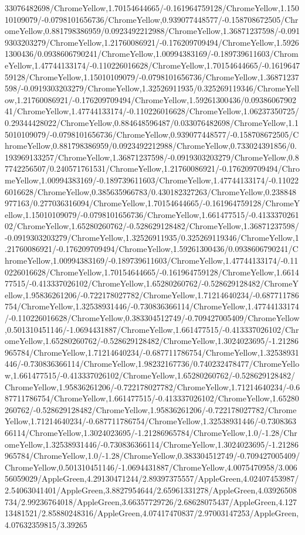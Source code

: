 {\begin{tikzternal}
33076482698/ChromeYellow,1.70154644665/-0.161964759128/ChromeYellow,1.15010109079/-0.0798101656736/ChromeYellow,0.939077448577/-0.158708672505/ChromeYellow,0.881798386959/0.0923492212988/ChromeYellow,1.36871237598/-0.0919303203279/ChromeYellow,1.21760086921/-0.176209709494/ChromeYellow,1.59261300436/0.0938606790241/ChromeYellow,1.00994383169/-0.189739611603/ChromeYellow,1.47744133174/-0.110226016628/ChromeYellow,1.70154644665/-0.161964759128/ChromeYellow,1.15010109079/-0.0798101656736/ChromeYellow,1.36871237598/-0.0919303203279/ChromeYellow,1.32526911935/0.325269119346/ChromeYellow,1.21760086921/-0.176209709494/ChromeYellow,1.59261300436/0.0938606790241/ChromeYellow,1.47744133174/-0.110226016628/ChromeYellow,1.06237350725/0.29344428022/ChromeYellow,0.884648596487/0.033076482698/ChromeYellow,1.15010109079/-0.0798101656736/ChromeYellow,0.939077448577/-0.158708672505/ChromeYellow,0.881798386959/0.0923492212988/ChromeYellow,0.733024391856/0.193969133257/ChromeYellow,1.36871237598/-0.0919303203279/ChromeYellow,0.87742256507/0.240571761531/ChromeYellow,1.21760086921/-0.176209709494/ChromeYellow,1.00994383169/-0.189739611603/ChromeYellow,1.47744133174/-0.110226016628/ChromeYellow,0.385635966783/0.430182327263/ChromeYellow,0.238848977163/0.277036316094/ChromeYellow,1.70154644665/-0.161964759128/ChromeYellow,1.15010109079/-0.0798101656736/ChromeYellow,1.661477515/-0.413337026102/ChromeYellow,1.65280260762/-0.528629128482/ChromeYellow,1.36871237598/-0.0919303203279/ChromeYellow,1.32526911935/0.325269119346/ChromeYellow,1.21760086921/-0.176209709494/ChromeYellow,1.59261300436/0.0938606790241/ChromeYellow,1.00994383169/-0.189739611603/ChromeYellow,1.47744133174/-0.110226016628/ChromeYellow,1.70154644665/-0.161964759128/ChromeYellow,1.661477515/-0.413337026102/ChromeYellow,1.65280260762/-0.528629128482/ChromeYellow,1.95836261206/-0.722178027782/ChromeYellow,1.71214640234/-0.687711786754/ChromeYellow,1.32538931446/-0.730836366114/ChromeYellow,1.47744133174/-0.110226016628/ChromeYellow,0.383304512749/-0.709427005409/ChromeYellow,0.501310451146/-1.0694431887/ChromeYellow,1.661477515/-0.413337026102/ChromeYellow,1.65280260762/-0.528629128482/ChromeYellow,1.3024023695/-1.21286965784/ChromeYellow,1.71214640234/-0.687711786754/ChromeYellow,1.32538931446/-0.730836366114/ChromeYellow,1.98232167736/0.740232478477/ChromeYellow,1.661477515/-0.413337026102/ChromeYellow,1.65280260762/-0.528629128482/ChromeYellow,1.95836261206/-0.722178027782/ChromeYellow,1.71214640234/-0.687711786754/ChromeYellow,1.661477515/-0.413337026102/ChromeYellow,1.65280260762/-0.528629128482/ChromeYellow,1.95836261206/-0.722178027782/ChromeYellow,1.71214640234/-0.687711786754/ChromeYellow,1.32538931446/-0.730836366114/ChromeYellow,1.3024023695/-1.21286965784/ChromeYellow,1.0/-1.28/ChromeYellow,1.32538931446/-0.730836366114/ChromeYellow,1.3024023695/-1.21286965784/ChromeYellow,1.0/-1.28/ChromeYellow,0.383304512749/-0.709427005409/ChromeYellow,0.501310451146/-1.0694431887/ChromeYellow,4.0075470958/3.00656059029/AppleGreen,4.29130471244/2.89397375557/AppleGreen,4.02407453987/2.54063041401/AppleGreen,3.8827954644/2.65961331278/AppleGreen,4.03926508734/2.99236764018/AppleGreen,3.66357729726/2.68628075437/AppleGreen,4.12713481521/2.85880248316/AppleGreen,4.07417470837/2.97003147253/AppleGreen,4.07632359815/3.39265
\end{tikzternal}}
